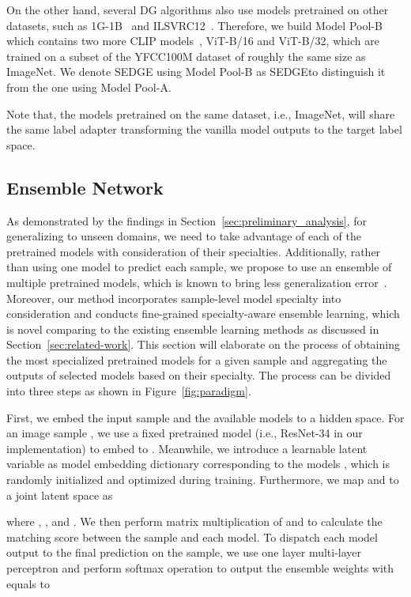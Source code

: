 \documentclass{article}
\newcommand{\method}{\textsc{SEDGE}\xspace}
\newcommand{\methodplus}{\textsc{SEDGE}}
\begin{document}
On the other hand, several DG algorithms also use models pretrained on other datasets, such as 1G-1B~\citep{arpit2021ensemble} and ILSVRC12~\citep{thomas2021adaptive}. 
Therefore, we build Model Pool-B which contains two more CLIP models~\citep{radford2021learning}, ViT-B/16 and ViT-B/32, which are trained on a subset of the YFCC100M dataset of roughly the same size as ImageNet.
We denote \method using Model Pool-B as \methodplus to distinguish it from the one using Model Pool-A.

Note that, the models pretrained on the same dataset, i.e., ImageNet, will share the same label adapter transforming the vanilla model outputs to the target label space.

\subsection{Ensemble Network}\label{sec: model ensemble}

As demonstrated by the findings in Section~\ref{sec:preliminary_analysis}, for generalizing to unseen domains, we need to take advantage of each of the pretrained models with consideration of their specialties.
Additionally, rather than using one model to predict each sample, we propose to use an ensemble of multiple pretrained models, which is known to bring less generalization error~\citep{ueda1996generalization}.
Moreover, our method incorporates sample-level model specialty into consideration and conducts fine-grained specialty-aware ensemble learning, which is novel comparing to the existing ensemble learning methods as discussed in Section~\ref{sec:related-work}.
This section will elaborate on the process of obtaining the most specialized pretrained models for a given sample  
and aggregating the outputs of selected models based on their specialty.  
The process can be divided into three steps as shown in Figure~\ref{fig:paradigm}.





First, we embed the input sample and the available models to a hidden space. 
For an image sample , we use a fixed pretrained model (i.e., ResNet-34 in our implementation) to embed  to . 
Meanwhile, we introduce a learnable latent variable  as model embedding dictionary corresponding to the  models , which is randomly initialized and optimized during training.
Furthermore, we map  and  to a joint latent space as

where , , and . 
We then perform matrix multiplication of  and  to calculate the matching score  between the sample and each model.
To dispatch each model output to the final prediction on the sample,
we use one layer multi-layer perceptron and perform softmax operation to output the ensemble weights  with  equals to
\end{document}

